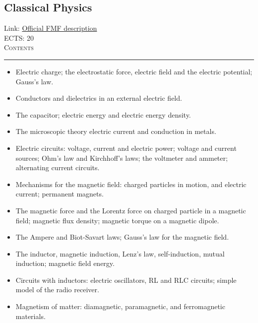 \documentclass[11pt, a4paper]{article}
\newenvironment{course}[3]{
\subsection{#1}%
Link: \href{#2}{Official FMF description}\\%
ECTS: #3%
\vspace{1ex}
\\
{\large \textsc{Contents}}\\[-0.9ex]%
\rule{\textwidth}{0.5pt}
\vspace{-3ex}
}
{}
\newenvironment{chapter}[1]{
\begin{tcolorbox}[title=#1, breakable]
}
{\end{tcolorbox}}
\begin{document}
\begin{course}{Classical Physics}{https://www.fmf.uni-lj.si/en/study-physics/programmes/1fiz/2020/7000777/courses/1154/}{20}
\begin{chapter}{Electrostatics}
    \begin{itemize}

        \item Electric charge; the electrostatic force, electric field and the electric potential; Gauss’s law.
        
        \item Conductors and dielectrics in an external electric field. 

        \item The capacitor; electric energy and electric energy density. 

        \item The microscopic theory electric current and conduction in metals.

        \item Electric circuits: voltage, current and electric power; voltage and current sources; Ohm’s law and Kirchhoff’s laws; the voltmeter and ammeter; alternating current circuits.

    \end{itemize}
\end{chapter}

\begin{chapter}{Magnetostatics and magnetic induction}
    \begin{itemize}
    
        \item Mechanisms for the magnetic field: charged particles in motion, and electric current; permanent magnets.

        \item The magnetic force and the Lorentz force on charged particle in a magnetic field; magnetic flux density; magnetic torque on a magnetic dipole.

        \item The Ampere and Biot-Savart laws; Gauss's law for the magnetic field.

        \item The inductor, magnetic induction, Lenz's law, self-induction, mutual induction; magnetic field energy.

        \item Circuits with inductors: electric oscillators, RL and RLC circuits; simple model of the radio receiver.

        \item Magnetism of matter: diamagnetic, paramagnetic, and ferromagnetic materials. 
    \end{itemize}
\end{chapter}


\end{course}
\end{document}
